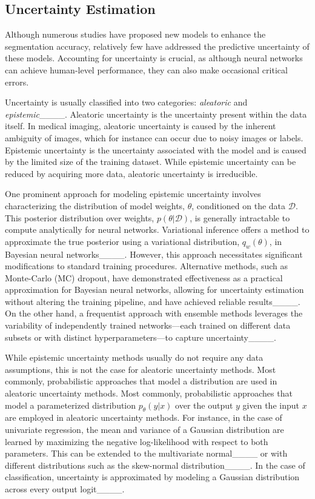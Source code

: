 \subsection{Uncertainty Estimation}

Although numerous studies have proposed new models to enhance the segmentation accuracy, relatively few have addressed the predictive uncertainty of these models. Accounting for uncertainty is crucial, as although neural networks can achieve human-level performance, they can also make occasional critical errors.


Uncertainty is usually classified into two categories: {\em aleatoric} and {\em epistemic}____. Aleatoric uncertainty is the uncertainty present within the data itself. In medical imaging, aleatoric uncertainty is caused by the inherent ambiguity of images, which for instance can occur due to noisy images or labels.
Epistemic uncertainty is the uncertainty associated with the model and is caused by the limited size of the training dataset. While epistemic uncertainty can be reduced by acquiring more data, 
aleatoric uncertainty is irreducible.



One prominent approach for modeling epistemic uncertainty involves characterizing the distribution of model weights, $\theta$, conditioned on the data $\mathcal{D}$. This posterior distribution over weights, $p(\theta|\mathcal{D})$, is generally intractable to compute analytically for neural networks. Variational inference offers a method to approximate the true posterior using a variational distribution, $q_w(\theta)$, in Bayesian neural networks____. However, this approach necessitates significant modifications to standard training procedures. Alternative methods, such as Monte-Carlo (MC) dropout, have demonstrated effectiveness as a practical approximation for Bayesian neural networks, allowing for uncertainty estimation without altering the training pipeline, and have achieved reliable results____. On the other hand, a frequentist approach with ensemble methods leverages the variability of independently trained networks—each trained on different data subsets or with distinct hyperparameters—to capture uncertainty____.



While epistemic uncertainty methods usually do not require any data assumptions, this is not the case for aleatoric uncertainty methods. 
Most commonly, probabilistic approaches that model a distribution are used in aleatoric uncertainty methods. 
Most commonly, probabilistic approaches that model a parameterized distribution $p_\theta(y|x)$ over the output $y$ given the input $x$ are employed in aleatoric uncertainty methods. For instance, in the case of univariate regression, the mean and variance of a Gaussian distribution are learned by maximizing the negative log-likelihood with respect to both parameters. This can be extended to the multivariate normal____ or with different distributions such as the skew-normal distribution____. In the case of classification, uncertainty is approximated by modeling a Gaussian distribution across every output logit____.



